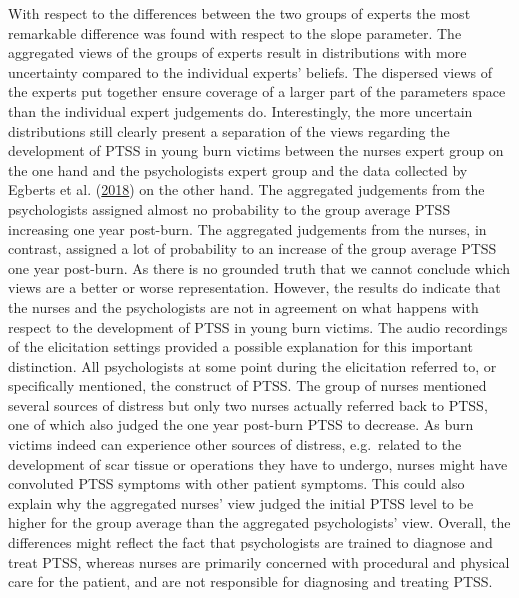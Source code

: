 \documentclass[openright,titlepage,12pt,a4paper]{book}
\begin{document}
With respect to the differences between the two groups of experts the most remarkable difference was found with respect to the slope parameter. The aggregated views of the groups of experts result in distributions with more uncertainty compared to the individual experts' beliefs. The dispersed views of the experts put together ensure coverage of a larger part of the parameters space than the individual expert judgements do. Interestingly, the more uncertain distributions still clearly present a separation of the views regarding the development of PTSS in young burn victims between the nurses expert group on the one hand and the psychologists expert group and the data collected by Egberts et al. (\protect\hyperlink{ref-egberts_mother_2018}{2018}) on the other hand. The aggregated judgements from the psychologists assigned almost no probability to the group average PTSS increasing one year post-burn. The aggregated judgements from the nurses, in contrast, assigned a lot of probability to an increase of the group average PTSS one year post-burn. As there is no grounded truth that we cannot conclude which views are a better or worse representation. However, the results do indicate that the nurses and the psychologists are not in agreement on what happens with respect to the development of PTSS in young burn victims. The audio recordings of the elicitation settings provided a possible explanation for this important distinction. All psychologists at some point during the elicitation referred to, or specifically mentioned, the construct of PTSS. The group of nurses mentioned several sources of distress but only two nurses actually referred back to PTSS, one of which also judged the one year post-burn PTSS to decrease. As burn victims indeed can experience other sources of distress, e.g.~related to the development of scar tissue or operations they have to undergo, nurses might have convoluted PTSS symptoms with other patient symptoms. This could also explain why the aggregated nurses' view judged the initial PTSS level to be higher for the group average than the aggregated psychologists' view. Overall, the differences might reflect the fact that psychologists are trained to diagnose and treat PTSS, whereas nurses are primarily concerned with procedural and physical care for the patient, and are not responsible for diagnosing and treating PTSS.
\end{document}
